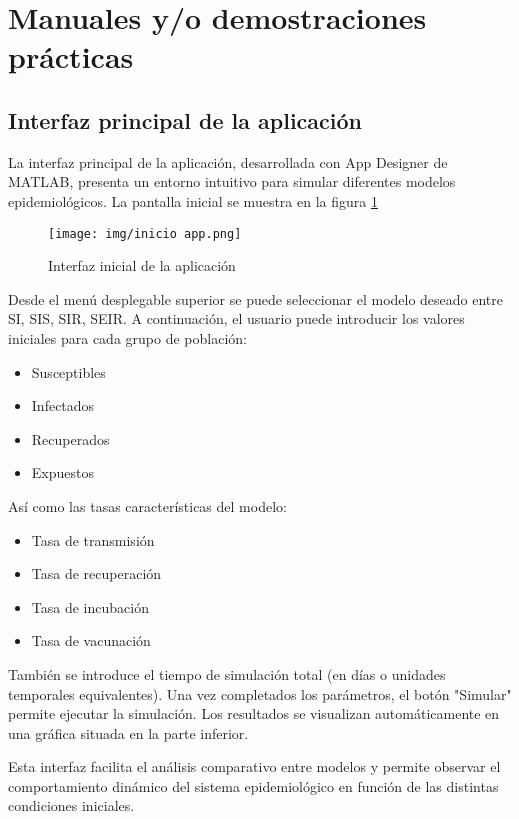\section{Manuales y/o demostraciones prácticas}
\subsection{Interfaz principal de la aplicación}
La interfaz principal de la aplicación, desarrollada con App Designer de MATLAB, presenta un entorno intuitivo para simular diferentes modelos epidemiológicos. La pantalla inicial se muestra en la figura \ref{fig:app inicio}


\begin{figure}[H]
        \centering
        \texttt{[image: img/inicio app.png]}
        \caption{Interfaz inicial de la aplicación}
        \label{fig:app inicio}
        \vspace{0.5cm} %
    \end{figure}

Desde el menú desplegable superior se puede seleccionar el modelo deseado entre SI, SIS, SIR, SEIR. A continuación, el usuario puede introducir los valores iniciales para cada grupo de población:
\begin{itemize}
    \item Susceptibles
    \item Infectados
    \item Recuperados
    \item Expuestos
\end{itemize}
Así como las tasas características del modelo:
\begin{itemize}
    \item Tasa de transmisión
    \item Tasa de recuperación
    \item Tasa de incubación
    \item Tasa de vacunación
\end{itemize}
También se introduce el tiempo de simulación total (en días o unidades temporales equivalentes). Una vez completados los parámetros, el botón "Simular" permite ejecutar la simulación. Los resultados se visualizan automáticamente en una gráfica situada en la parte inferior.

Esta interfaz facilita el análisis comparativo entre modelos y permite observar el comportamiento dinámico del sistema epidemiológico en función de las distintas condiciones iniciales.

